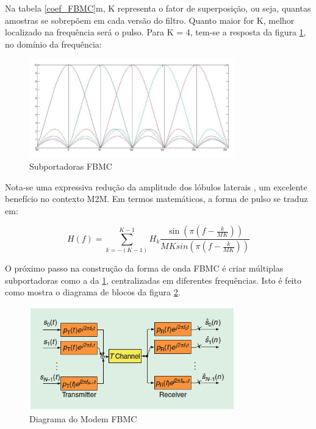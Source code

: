 Na tabela \ref{coef_FBMC}m, K representa o fator de superposição, ou seja, quantas amostras se sobrepõem em cada versão do filtro. Quanto maior for K, melhor localizado na frequência será o pulso. Para K = 4, tem-se a resposta da figura \ref{fig_FBMC}, no domínio da frequência:

\begin{figure}[h!]
\centering
\includegraphics[width=3.5in]{fig_OFDM_freq.png}
\caption{Subportadoras FBMC}
\label{fig_FBMC}
\end{figure}

\par Nota-se uma expressiva redução da amplitude dos lóbulos laterais \cite{Bellanger}, um excelente benefício no contexto M2M. Em termos matemáticos, a forma de pulso se traduz em\cite{Bellanger}: 

\begin{equation}\label{eq_freq}
H(f) = \sum_{k=-(K-1)}^{K-1}H_{k}\frac{\sin(\pi(f-\frac{k}{MK}))}{MKsin(\pi(f-\frac{k}{MK}))}
\end{equation}

\par O próximo passo na construção da forma de onda FBMC é criar múltiplas subportadoras como a da \ref{fig_FBMC}, centralizadas em diferentes frequências. Isto é feito como mostra o diagrama de blocos da figura \ref{Trans_FBMC}. 

\begin{figure}[h!]
\centering
\includegraphics[width=3.5in]{Trans_FBMC.png}
\caption{Diagrama do Modem FBMC \cite{Boroujeny}}
\label{Trans_FBMC}
\end{figure}

